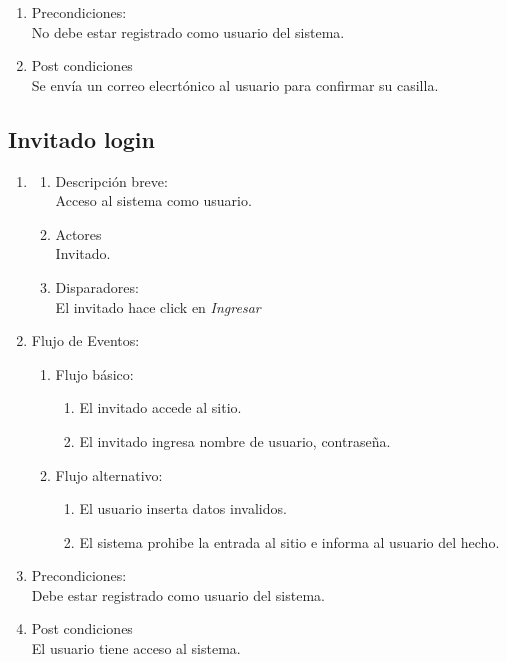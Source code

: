 \documentclass[a4paper,11pt]{article}
\begin{document}
\begin{enumerate}
    \item Precondiciones: \\
        No debe estar registrado como usuario del sistema.

    \item Post condiciones \\
        Se envía un correo elecrtónico al usuario para confirmar su casilla.


\end{enumerate}

\subsection{Invitado login}
\begin{enumerate}

    \item
        \begin{enumerate}
            \item Descripción breve: \\
                Acceso al sistema como usuario.
            \item Actores \\
                Invitado.
            \item Disparadores: \\
                El invitado hace click en \emph{Ingresar}
        \end{enumerate}

    \item Flujo de Eventos:
        \begin{enumerate}
            \item Flujo básico:
        	\begin{enumerate}
		\item	El invitado accede al sitio.
                \item 	El invitado ingresa nombre de usuario, contraseña. 
		\end{enumerate}
            \item Flujo alternativo:\\
		\begin{enumerate}
		\item	El usuario inserta datos invalidos.
		\item 	El sistema prohibe la entrada al sitio e informa al usuario del hecho.
		\end{enumerate}
        \end{enumerate}
        \item Precondiciones: \\
            Debe estar registrado como usuario del sistema.
        \item Post condiciones \\
            El usuario tiene acceso al sistema.
\end{enumerate}
\end{document}
